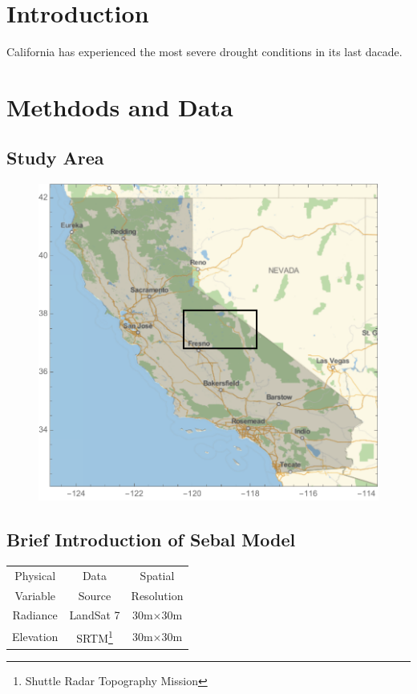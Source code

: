 \documentclass[12pt]{article}
\begin{document}
\section{Introduction}
California has experienced the most severe drought conditions in its last dacade\cite{griffin2014unusual}. 

\section{Methdods and Data}
\subsection{Study Area}
\begin{figure}[H]
\begin{center}
\includegraphics[width=.7\linewidth]{california.pdf}
\end{center}
\end{figure}
\subsection{Brief Introduction of Sebal Model}
\begin{table}[H]
    \begin{tabular}{ccc}
	    \hline
		        Physical&Data&Spatial\\
					        Variable&Source&Resolution\\
							        \hline
									        \textcolor[rgb]{1,0,0}{Radiance}&LandSat 7&30m$\times$30m\\
												        \textcolor[rgb]{1,0,0}{Elevation}&SRTM\footnote{Shuttle Radar Topography Mission}&30m$\times$30m\\
														        \hline
																    \end{tabular}
																	\end{table}
\end{document}
